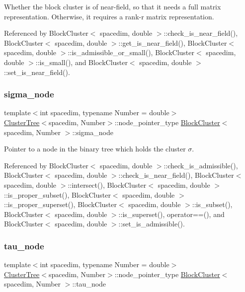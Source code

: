 Whether the block cluster is of near-\/field, so that it needs a full matrix representation. Otherwise, it requires a rank-\/r matrix representation. 

Referenced by Block\+Cluster$<$ spacedim, double $>$\+::check\+\_\+is\+\_\+near\+\_\+field(), Block\+Cluster$<$ spacedim, double $>$\+::get\+\_\+is\+\_\+near\+\_\+field(), Block\+Cluster$<$ spacedim, double $>$\+::is\+\_\+admissible\+\_\+or\+\_\+small(), Block\+Cluster$<$ spacedim, double $>$\+::is\+\_\+small(), and Block\+Cluster$<$ spacedim, double $>$\+::set\+\_\+is\+\_\+near\+\_\+field().

\mbox{\label{classBlockCluster_ae1005ec7feedbdb990b27d845b24bad2}} 
\subsubsection{\texorpdfstring{sigma\+\_\+node}{sigma\_node}}
{\footnotesize\ttfamily template$<$int spacedim, typename Number = double$>$ \\
\hyperlink{classClusterTree}{Cluster\+Tree}$<$spacedim, Number$>$\+::node\+\_\+pointer\+\_\+type \hyperlink{classBlockCluster}{Block\+Cluster}$<$ spacedim, Number $>$\+::sigma\+\_\+node\hspace{0.3cm}{\ttfamily [private]}}

Pointer to a node in the binary tree which holds the cluster $\sigma$. 

Referenced by Block\+Cluster$<$ spacedim, double $>$\+::check\+\_\+is\+\_\+admissible(), Block\+Cluster$<$ spacedim, double $>$\+::check\+\_\+is\+\_\+near\+\_\+field(), Block\+Cluster$<$ spacedim, double $>$\+::intersect(), Block\+Cluster$<$ spacedim, double $>$\+::is\+\_\+proper\+\_\+subset(), Block\+Cluster$<$ spacedim, double $>$\+::is\+\_\+proper\+\_\+superset(), Block\+Cluster$<$ spacedim, double $>$\+::is\+\_\+subset(), Block\+Cluster$<$ spacedim, double $>$\+::is\+\_\+superset(), operator==(), and Block\+Cluster$<$ spacedim, double $>$\+::set\+\_\+is\+\_\+admissible().

\mbox{\label{classBlockCluster_aac88834478cb4e409596e58100a5e9de}} 
\subsubsection{\texorpdfstring{tau\+\_\+node}{tau\_node}}
{\footnotesize\ttfamily template$<$int spacedim, typename Number = double$>$ \\
\hyperlink{classClusterTree}{Cluster\+Tree}$<$spacedim, Number$>$\+::node\+\_\+pointer\+\_\+type \hyperlink{classBlockCluster}{Block\+Cluster}$<$ spacedim, Number $>$\+::tau\+\_\+node\hspace{0.3cm}{\ttfamily [private]}}

